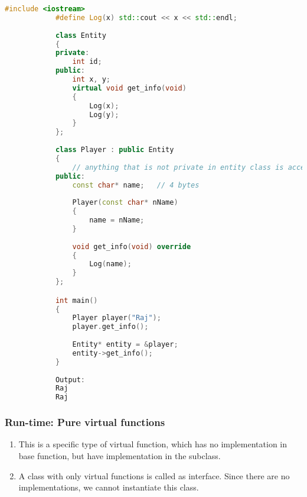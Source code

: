 \documentclass{article}
\begin{document}
        \begin{lstlisting}[language=C++, caption=Virtual function example]
            #include <iostream>
            #define Log(x) std::cout << x << std::endl;
            
            class Entity
            {
            private:
            	int id;
            public:
            	int x, y;
            	virtual void get_info(void)
            	{
            		Log(x);
            		Log(y);
            	}
            };
            
            class Player : public Entity
            {
            	// anything that is not private in entity class is accessible by player
            public:
            	const char* name;	// 4 bytes
            
            	Player(const char* nName)
            	{
            		name = nName;
            	}
            
            	void get_info(void) override
            	{
            		Log(name);
            	}
            };

            int main()
            {
            	Player player("Raj");
            	player.get_info();
            	
            	Entity* entity = &player;
            	entity->get_info();
            }
    
            Output:
            Raj
            Raj
        \end{lstlisting}

        \subsubsection{Run-time: Pure virtual functions}    
        \begin{enumerate}
            \item This is a specific type of virtual function, which has no implementation in base function, but have implementation in the subclass.
            \item A class with only virtual functions is called as interface. Since there are no implementations, we cannot instantiate this class. 
            
        \end{enumerate} 
        
\end{document}

